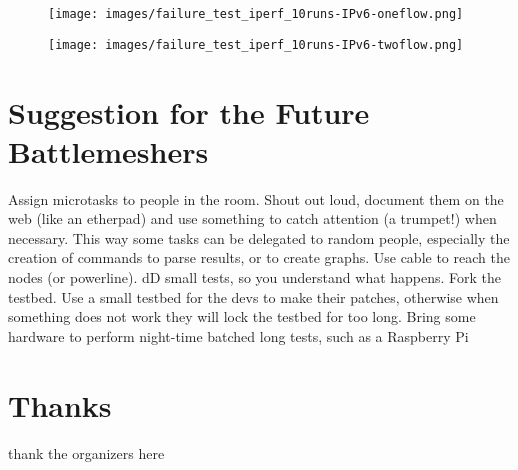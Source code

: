 \documentclass[10pt,onecolumn]{paper}
\begin{document}
\begin{figure}
  \centering
    \texttt{[image: images/failure\_test\_iperf\_10runs-IPv6-oneflow.png]}
    \caption{}
  \label{fig:iperfoneflow}
\end{figure}

\begin{figure}
  \centering
    \texttt{[image: images/failure\_test\_iperf\_10runs-IPv6-twoflow.png]}
    \caption{}
  \label{fig:iperftwoflows}
\end{figure}



\section{Suggestion for the Future Battlemeshers}

\bi
\ii Assign microtasks to people in the room. Shout out loud, document them on
the web (like an etherpad) and use something to catch attention (a trumpet!)
when necessary. This way some tasks can be delegated to random people,
especially the creation of commands to parse results, or to create graphs.
\ii Use cable to reach the nodes (or powerline).
\ii dD small tests, so you understand what happens.
\ii Fork the testbed. Use a small testbed for the devs to make their patches,
otherwise when something does not work they will lock the testbed for too long.
\ii Bring some hardware to perform night-time batched long tests, such as a
Raspberry Pi
\ei 


\section{Thanks}
thank the organizers here


\end{document}
